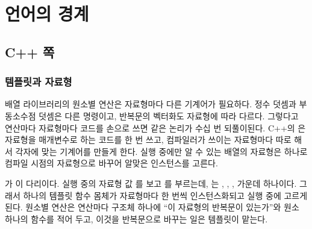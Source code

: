 \chapter{언어의 경계}
\label{ch:language-boundary}


\section{C++ 쪽}
\label{sec:cpp-side}

\subsection{템플릿과 자료형}

배열 라이브러리의 원소별 연산은 자료형마다 다른 기계어가 필요하다. 정수 덧셈과 부동소수점 덧셈은 다른 명령이고, 반복문의 벡터화도 자료형에 따라 다르다. 그렇다고 연산마다 자료형마다 코드를 손으로 쓰면 같은 논리가 수십 번 되풀이된다. C++의 은 자료형을 매개변수로 하는 코드를 한 번 쓰고, 컴파일러가 쓰이는 자료형마다 따로 해서 각자에 맞는 기계어를 만들게 한다\cite{vandevoorde2017templates}. 실행 중에만 알 수 있는 배열의 자료형은  하나로 컴파일 시점의 자료형으로 바꾸어 알맞은 인스턴스를 고른다.

\begin{instardust}
가 이 다리이다. 실행 중의 자료형 값 를 보고 를 부르는데, 는 , , ,  가운데 하나이다. 그래서 하나의 템플릿 함수 몸체가 자료형마다 한 번씩 인스턴스화되고 실행 중에 고르게 된다. 원소별 연산은 연산마다 구조체 하나에 ``이 자료형의 반복문이 있는가''와 원소 하나의 함수를 적어 두고, 이것을 반복문으로 바꾸는 일은 템플릿이 맡는다.
\end{instardust}

